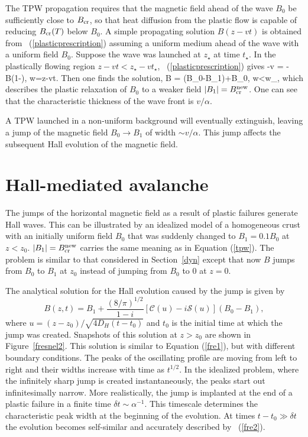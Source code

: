 The TPW
propagation requires that
the magnetic field ahead of the wave $B_0$ 
be sufficiently close to $B_{\rm cr}$, so that heat diffusion from the plastic flow 
is capable of reducing
$B_{\rm cr}(T)$
below $B_0$. A simple propagating solution $B(z-vt)$ is obtained from 
\Eq~(\ref{plasticprescription}) assuming a uniform medium ahead of the wave with 
a uniform field $B_0$. Suppose the wave was launched at $z_\star$ at time $t_\star$.
In the plastically flowing region $z-vt<z_\star-vt_\star$,
\Eq~(\ref{plasticprescription}) gives
\beq
-v  = -\alpha B\left(1-\right), 
\qquad w=z-vt.
\eeq
Then one finds the solution,
\beq\label{tpw}
B = (B_0-B_1)\exp{}+B_0,  \quad w<w_\star,
\eeq 
which describes the plastic relaxation of $B_0$ to a weaker field $|B_1|=B_{\rm cr}^{\rm new}$.
One can see that the characteristic thickness of the wave front is $v/\alpha$.

A TPW launched in a non-uniform background will eventually extinguish, leaving 
a jump of the magnetic field $B_0\rightarrow B_1$ of width $\sim v/\alpha$. This jump affects the subsequent Hall evolution of the magnetic field.

\section{Hall-mediated avalanche}\label{avalanche}

The jumps of the horizontal magnetic field as a result of plastic failures generate Hall waves.
This can be illustrated by an idealized model of a homogeneous crust with an initially uniform field $B_0$ that was suddenly changed to $B_1=0.1B_0$ at $z<z_0$. 
$|B_1|=B_{\rm cr}^{\rm new}$ carries the same meaning as in Equation (\ref{tpw}).
The problem is similar to that considered in Section~\ref{dyn} except that now $B$ jumps from $B_0$ to $B_1$ at $z_0$ instead of jumping from $B_0$ to $0$ at $z=0$.

The analytical solution for the Hall evolution caused by the jump is given by
\begin{equation}\label{fre2}
B(z,t)=B_1+ \frac{(8/\pi)^{1/2}}{1-i}\left[\mathcal{C}(u)-i\mathcal{S}(u)\right](B_0-B_1),
\end{equation}
where $u = (z-z_0)/\sqrt{4D_H (t-t_0)}$ and $t_0$ is the initial time at which the jump was created. 
Snapshots of this solution at $z>z_0$ are shown in Figure~\ref{fresnel2}.
This solution is similar to Equation (\ref{fre1}), but with different boundary conditions.
The peaks of the oscillating profile are moving from left to right and their widths increase with time as $t^{1/2}$. 
In the idealized problem, where the infinitely sharp jump is created instantaneously, the peaks start out infinitesimally narrow.
More realistically, the jump is implanted at the end of a plastic failure in a finite time $\delta t\sim \alpha^{-1}$. This timescale determines the characteristic peak width at the beginning of the evolution. 
At times $t-t_0\gg\delta t$ the evolution becomes self-similar and accurately described by \Eq~(\ref{fre2}).


